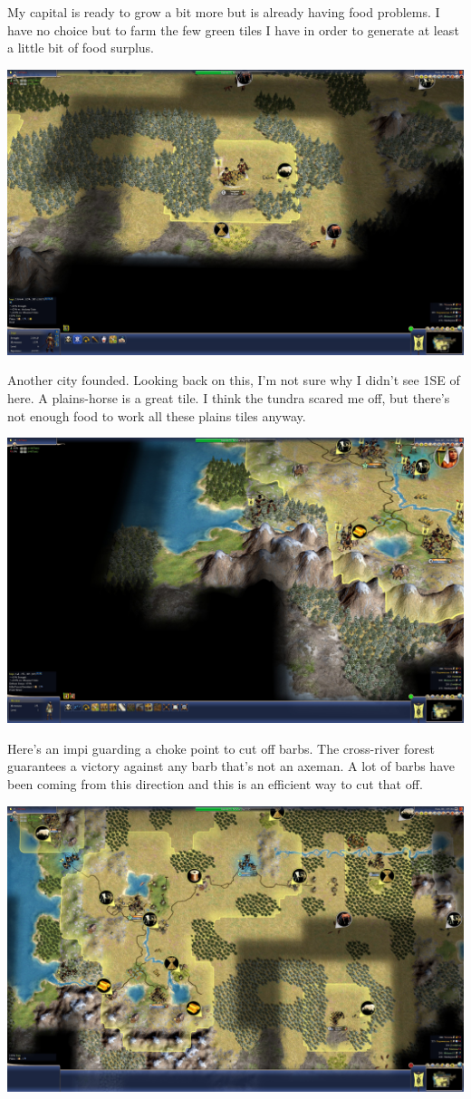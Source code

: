 \documentclass[10pt]{article}
\begin{document}
My capital is ready to grow a bit more but is already having food problems. I have no choice but to farm the
few green tiles I have in order to generate at least a little bit of food surplus.

\includegraphics[width=1.0\textwidth]{53}

Another city founded. Looking back on this, I'm not sure why I didn't see 1SE of here. A plains-horse is
a great tile. I think the tundra scared me off, but there's not enough food to work all these plains tiles
anyway.

\includegraphics[width=1.0\textwidth]{54}

Here's an impi guarding a choke point to cut off barbs. The cross-river forest guarantees a victory against any
barb that's not an axeman. A lot of barbs have been coming from this direction and this is an efficient way
to cut that off.

\includegraphics[width=1.0\textwidth]{55}
\end{document}

